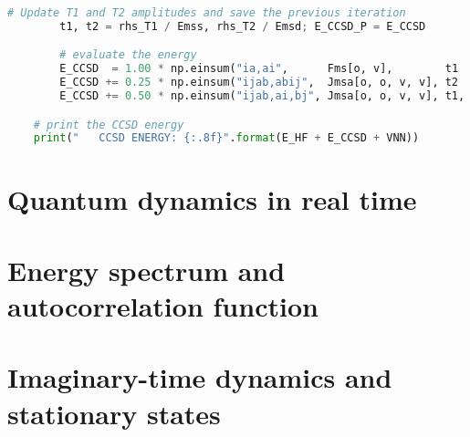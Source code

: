 \begin{lstlisting}[language=Python, caption={\acrshort{ccd} and \acrshort{ccsd} method exercise code solution.}, label=code:cc_solution]
        # Update T1 and T2 amplitudes and save the previous iteration
        t1, t2 = rhs_T1 / Emss, rhs_T2 / Emsd; E_CCSD_P = E_CCSD

        # evaluate the energy
        E_CCSD  = 1.00 * np.einsum("ia,ai",      Fms[o, v],        t1    )
        E_CCSD += 0.25 * np.einsum("ijab,abij",  Jmsa[o, o, v, v], t2    )
        E_CCSD += 0.50 * np.einsum("ijab,ai,bj", Jmsa[o, o, v, v], t1, t1)

    # print the CCSD energy
    print("   CCSD ENERGY: {:.8f}".format(E_HF + E_CCSD + VNN))
\end{lstlisting}


\section*{Quantum dynamics in real time}

\lstset{style=mystyle}


\section*{Energy spectrum and autocorrelation function}

\lstset{style=mystyle}


\section*{Imaginary-time dynamics and stationary states}

\lstset{style=mystyle}
